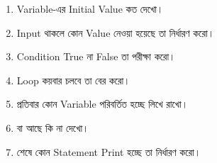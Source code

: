 
\begin{enumerate}

\item Variable-এর Initial Value কত দেখো।

\item Input থাকলে কোন Value নেওয়া হয়েছে তা নির্ধারণ করো।

\item Condition True না False তা পরীক্ষা করো।

\item Loop কয়বার চলবে তা বের করো।

\item প্রতিবার কোন Variable পরিবর্তিত হচ্ছে লিখে রাখো।

\item {} বা  আছে কি না দেখো।

\item শেষে কোন Statement Print হচ্ছে তা নির্ধারণ করো।

\end{enumerate}


